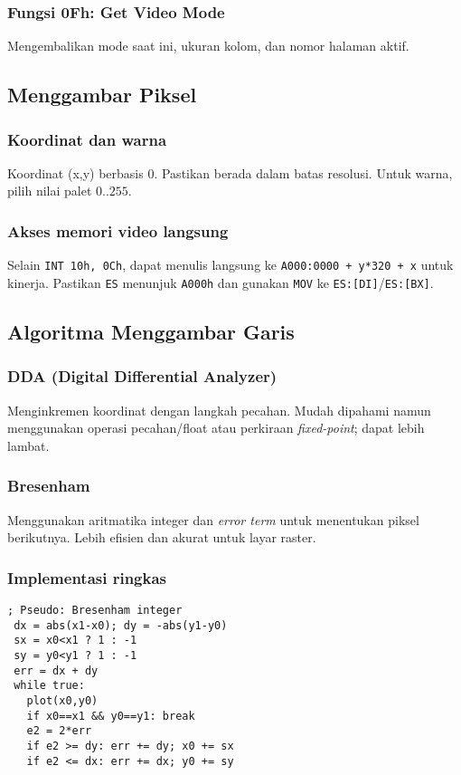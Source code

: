 \subsubsection{Fungsi 0Fh: Get Video Mode}
Mengembalikan mode saat ini, ukuran kolom, dan nomor halaman aktif.

\subsection{Menggambar Piksel}
\subsubsection{Koordinat dan warna}
Koordinat (x,y) berbasis 0. Pastikan berada dalam batas resolusi. Untuk warna, pilih nilai palet \(0..255\).

\subsubsection{Akses memori video langsung}
Selain \texttt{INT 10h, 0Ch}, dapat menulis langsung ke \texttt{A000:0000 + y*320 + x} untuk kinerja. Pastikan \texttt{ES} menunjuk \texttt{A000h} dan gunakan \texttt{MOV} ke \texttt{ES:[DI]}/\texttt{ES:[BX]}.

\subsection{Algoritma Menggambar Garis}
\subsubsection{DDA (Digital Differential Analyzer)}
Menginkremen koordinat dengan langkah pecahan. Mudah dipahami namun menggunakan operasi pecahan/float atau perkiraan \textit{fixed-point}; dapat lebih lambat.

\subsubsection{Bresenham}
Menggunakan aritmatika integer dan \textit{error term} untuk menentukan piksel berikutnya. Lebih efisien dan akurat untuk layar raster.

\subsubsection{Implementasi ringkas}
\begin{verbatim}
; Pseudo: Bresenham integer
 dx = abs(x1-x0); dy = -abs(y1-y0)
 sx = x0<x1 ? 1 : -1
 sy = y0<y1 ? 1 : -1
 err = dx + dy
 while true:
   plot(x0,y0)
   if x0==x1 && y0==y1: break
   e2 = 2*err
   if e2 >= dy: err += dy; x0 += sx
   if e2 <= dx: err += dx; y0 += sy
\end{verbatim}

